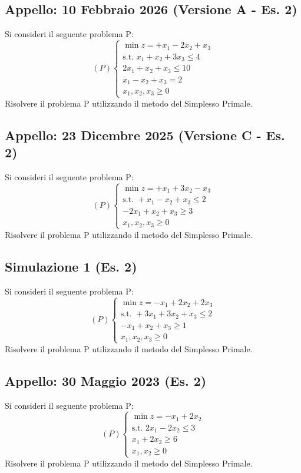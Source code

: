 \documentclass[11pt, a4paper]{article}
\begin{document}
\subsection{Appello: 10 Febbraio 2026 (Versione A - Es. 2)}
Si consideri il seguente problema P:
\[ (P) \begin{cases} \min z = +x_1 - 2x_2 + x_3 \\ \text{s.t. } x_1 + x_2 + 3x_3 \le 4 \\ 2x_1 + x_2 + x_3 \le 10 \\ x_1 - x_2 + x_3 = 2 \\ x_1, x_2, x_3 \ge 0 \end{cases} \]
Risolvere il problema P utilizzando il metodo del Simplesso Primale.

\subsection{Appello: 23 Dicembre 2025 (Versione C - Es. 2)}
Si consideri il seguente problema P:
\[ (P) \begin{cases} \min z = +x_1 + 3x_2 - x_3 \\ \text{s.t. } +x_1 - x_2 + x_3 \le 2 \\ -2x_1 + x_2 + x_3 \ge 3 \\ x_1, x_2, x_3 \ge 0 \end{cases} \]
Risolvere il problema P utilizzando il metodo del Simplesso Primale.

\subsection{Simulazione 1 (Es. 2)}
Si consideri il seguente problema P:
\[ (P) \begin{cases} \min z = -x_1 + 2x_2 + 2x_3 \\ \text{s.t. } +3x_1 + 3x_2 + x_3 \le 2 \\ -x_1 + x_2 + x_3 \ge 1 \\ x_1, x_2, x_3 \ge 0 \end{cases} \]
Risolvere il problema P utilizzando il metodo del Simplesso Primale.

\subsection{Appello: 30 Maggio 2023 (Es. 2)}
Si consideri il seguente problema P:
\[ (P) \begin{cases} \min z = -x_1 + 2x_2 \\ \text{s.t. } 2x_1 - 2x_2 \le 3 \\ x_1 + 2x_2 \ge 6 \\ x_1, x_2 \ge 0 \end{cases} \]
Risolvere il problema P utilizzando il metodo del Simplesso Primale.
\end{document}
